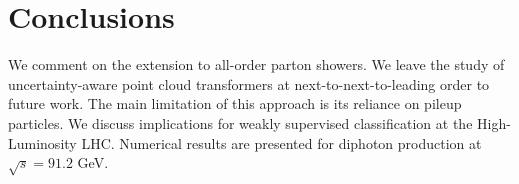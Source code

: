 \section{Conclusions}\label{sec:conclusions}

We comment on the extension to all-order parton showers. We leave the
study of uncertainty-aware point cloud transformers at
next-to-next-to-leading order to future work. The main limitation of
this approach is its reliance on pileup particles. We discuss
implications for weakly supervised classification at the High-Luminosity
LHC. Numerical results are presented for diphoton production at
$\sqrt{s} = 91.2$ GeV.

